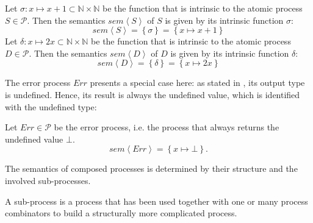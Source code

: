 \begin{example}
  \label{exp:sem_atomic}
  Let $\sigma \colon x \mapsto x+1 \subset \mathbb{N} \times \mathbb{N}$ be the function that is intrinsic to the atomic process $S \in \mathcal{P}$. Then the semantics $sem \left\langle S \right\rangle$ of $S$ is given by its intrinsic function $\sigma$:
  \begin{equation}
    sem \left\langle S \right\rangle = \left\{ \sigma \right\} = \left\{ x \mapsto x+1 \right\}
  \end{equation}
  Let $\delta \colon x \mapsto 2x \subset \mathbb{N} \times \mathbb{N}$ be the function that is intrinsic to the atomic process $D \in \mathcal{P}$. Then the semantics $sem \left\langle D \right\rangle$ of $D$ is given by its intrinsic function $\delta$:
  \begin{equation}
    sem \left\langle D \right\rangle = \left\{ \delta \right\} = \left\{ x \mapsto 2x \right\}
  \end{equation}
  \hfill\qedsymbol
\end{example}


The error process $Err$ presents a special case here: as stated in , its output type is undefined. Hence, its result is always the undefined value, which is identified with the undefined type:
\begin{definition}
\label{def:sem_err}
Let $Err \in \mathcal{P}$ be the error process, i.e. the process that always returns the undefined value $\bot$.
  \begin{equation}
    \label{eqn:sem_error}
    sem \left\langle Err \right\rangle = \left\{ x \mapsto \bot \right\}.
  \end{equation}
  \hfill\qedsymbol
\end{definition}

The semantics of composed processes is determined by their structure and the involved sub-processes. 

\begin{definition}
A sub-process is a process that has been used together with one or many process combinators to build a structurally more complicated process.

\hfill\qedsymbol
\end{definition}

